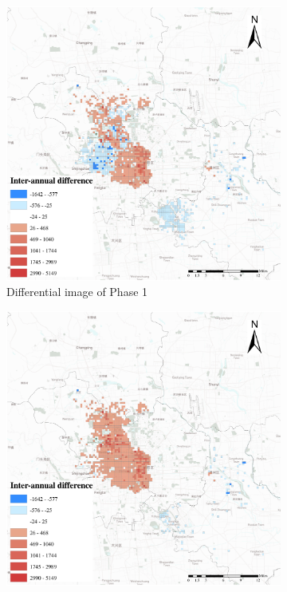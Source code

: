 \documentclass[preprints,ijgi,submit,moreauthors]{Definitions/mdpi}
\begin{document}
\begin{figure}[H]
    \vspace{6pt}
    \begin{subfigure}{.3\textwidth}
        \includegraphics[width=\textwidth]{Figures/BSSMinusmp1.eps}
        \caption{Differential image of Phase 1}
    \end{subfigure}
        \begin{subfigure}{.3\textwidth}
        \includegraphics[width=\textwidth]{Figures/BSSMinusmp2.eps}

\end{subfigure}
\end{figure}
\end{document}
